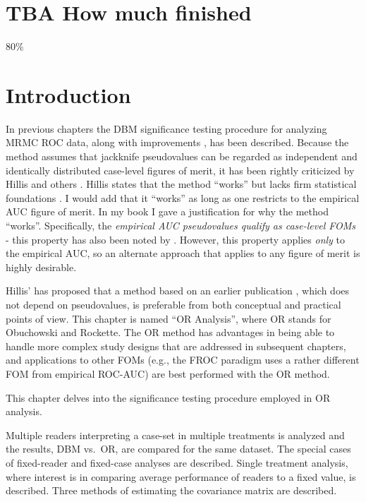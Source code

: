 \documentclass[
]{book}
\begin{document}
\hypertarget{or-analysis-st-how-much-finished}{%
\section{TBA How much finished}\label{or-analysis-st-how-much-finished}}

80\%

\hypertarget{or-analysis-st-introduction}{%
\section{Introduction}\label{or-analysis-st-introduction}}

In previous chapters the DBM significance testing procedure \citep{RN204} for analyzing MRMC ROC data, along with improvements \citep{RN2508}, has been described. Because the method assumes that jackknife pseudovalues can be regarded as independent and identically distributed case-level figures of merit, it has been rightly criticized by Hillis and others \citep{zhou2009statistical}. Hillis states that the method ``works'' but lacks firm statistical foundations \citep{RN1772, RN1865, RN1866}. I would add that it ``works'' as long as one restricts to the empirical AUC figure of merit. In my book I gave a justification for why the method ``works''. Specifically, the \emph{empirical AUC pseudovalues qualify as case-level FOMs} - this property has also been noted by \citep{RN1395}. However, this property applies \emph{only} to the empirical AUC, so an alternate approach that applies to any figure of merit is highly desirable.

Hillis' has proposed that a method based on an earlier publication \citep{RN1450}, which does not depend on pseudovalues, is preferable from both conceptual and practical points of view. This chapter is named ``OR Analysis'', where OR stands for Obuchowski and Rockette. The OR method has advantages in being able to handle more complex study designs \citep{RN2508} that are addressed in subsequent chapters, and applications to other FOMs (e.g., the FROC paradigm uses a rather different FOM from empirical ROC-AUC) are best performed with the OR method.

This chapter delves into the significance testing procedure employed in OR analysis.

Multiple readers interpreting a case-set in multiple treatments is analyzed and the results, DBM vs.~OR, are compared for the same dataset. The special cases of fixed-reader and fixed-case analyses are described. Single treatment analysis, where interest is in comparing average performance of readers to a fixed value, is described. Three methods of estimating the covariance matrix are described.
\end{document}
